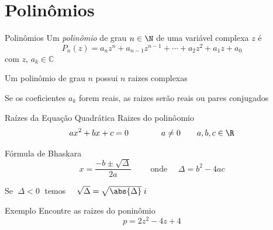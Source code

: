 \section{Polinômios}

\begin{frame}{Polinômios}
  Um \emph{polinômio} de grau $n\in\N$ de uma variável complexa $z$ \pause é
  \[
    P_n(z)
    = a_n z^n
    + a_{n-1} z^{n-1}
    + \cdots
    + a_2 z^2
    + a_1 z
    + a_0
  \]
  com \(z\), \(a_k\in\mathbb{C}\)

  \pause
  \vspace{\baselineskip}
  Um polinômio de grau $n$ possui $n$ raizes complexas

  \pause
  \vspace{\baselineskip}
  Se os coeficientes \(a_k\) forem reais, as raizes serão reais ou pares conjugados
\end{frame}
\begin{frame}{Raízes da Equação Quadrática}
  Raizes do polinôomio
  \[
    ax^2 + bx + c = 0
    \qquad\qquad
    a\neq 0
    \qquad
    a, b, c \in \R
  \]

  \pause
  Fórmula de Bhaskara
  \[
    x = \dfrac{\displaystyle -b \pm \sqrt{\Delta}}{2a}
    \qquad\text{ onde }\quad
    \Delta = b^2 - 4 ac
  \]

  \pause
  Se \(\;\Delta<0\;\) temos
  \(\quad \sqrt{\Delta} = \sqrt{\abs{\Delta}}\;i \)
\end{frame}

\addtocounter{exemplo}{1}
\begin{frame}{Exemplo \theexemplo}
  Encontre as raizes do poninômio
  \[
    p = 2z^2 -4z + 4
  \]
\end{frame}

